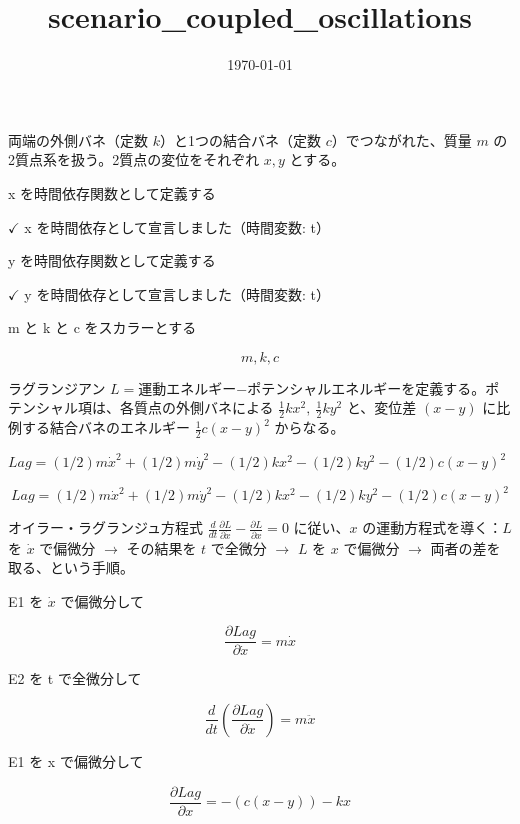 \documentclass[dvipdfmx,a4paper,11pt]{jsarticle}
\title{scenario\_coupled\_oscillations}
\date{\today}
\begin{document}
\maketitle

両端の外側バネ（定数 $k$）と1つの結合バネ（定数 $c$）でつながれた、質量 $m$ の2質点系を扱う。2質点の変位をそれぞれ $x,y$ とする。

x を時間依存関数として定義する

$\checkmark$ x を時間依存として宣言しました（時間変数: t）

y を時間依存関数として定義する

$\checkmark$ y を時間依存として宣言しました（時間変数: t）

m と k と c をスカラーとする

\[
  m, k, c
\]

ラグランジアン $L=$運動エネルギー$-$ポテンシャルエネルギーを定義する。ポテンシャル項は、各質点の外側バネによる $\frac12kx^2,\ \frac12ky^2$ と、変位差 $(x-y)$ に比例する結合バネのエネルギー $\frac12c(x-y)^2$ からなる。

$Lag = (1/2) m \dot{x}^2 + (1/2) m \dot{y}^2 - (1/2) k x^2 - (1/2) k y^2 - (1/2) c (x - y)^2$

\begin{equation}
  Lag = (1/2) m \dot{x}^2 + (1/2) m \dot{y}^2 - (1/2) k x^2 - (1/2) k y^2 - (1/2) c (x - y)^2
  \label{eq:E1}
\end{equation}

オイラー・ラグランジュ方程式 $\frac{d}{dt}\frac{\partial L}{\partial\dot x}-\frac{\partial L}{\partial x}=0$ に従い、$x$ の運動方程式を導く：$L$ を $\dot x$ で偏微分 $\to$ その結果を $t$ で全微分 $\to$ $L$ を $x$ で偏微分 $\to$ 両者の差を取る、という手順。

E1 を $\dot{x}$ で偏微分して

\begin{equation}
  \frac{\partial Lag}{\partial \dot{x}} = m \dot{x}
  \label{eq:E2}
\end{equation}

E2 を t で全微分して

\begin{equation}
  \frac{d}{dt}\left(\frac{\partial Lag}{\partial \dot{x}}\right) = m \ddot{x}
  \label{eq:E3}
\end{equation}

E1 を x で偏微分して

\begin{equation}
  \frac{\partial Lag}{\partial x} = -\left(c \left(x-y\right)\right)-k x
  \label{eq:E4}
\end{equation}
\end{document}
